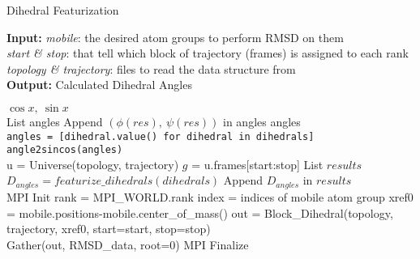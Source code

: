 \begin{algorithm}[ht!]
	\scriptsize
	\caption{Dihedral Featurization}
	\label{alg:Dihedral}
	\hspace*{\algorithmicindent} \textbf{Input:} \emph{mobile}: the desired atom groups to perform RMSD on them \\ 
	\hspace*{\algorithmicindent} \emph{start \& stop}: that tell which block of trajectory (frames) is assigned to each rank \\
	\hspace*{\algorithmicindent} \emph{topology \& trajectory}: files to read the data structure from \\
	\hspace*{\algorithmicindent} \textbf{Output:} Calculated Dihedral Angles
	\begin{algorithmic}[1]
		\State \Return $\cos{x},\: \sin{x}$
		\EndProcedure
		\\
		\State List angles
		\State Append $(\phi (res),\: \psi (res))$ in angles
		\EndFor
		\State \Return angles
		\EndProcedure
		\\
		\State \texttt{angles = [dihedral.value() for dihedral in dihedrals]}
		\State \Return \texttt{angle2sincos(angles)}
		\EndProcedure
		\\
		\State u = Universe(topology, trajectory)
		\State $g$ = u.frames[start:stop] 
		\State List $results$
		\State $D_{angles}=featurize\_dihedrals(dihedrals)$
		\State Append $D_{angles}$ in $results$ 
		\EndFor
		\EndProcedure
		\\      
		\State MPI Init 
		\State rank = MPI\_WORLD.rank
		\State index = indices of mobile atom group
		\State xref0 = mobile.positions-mobile.center\_of\_mass()
		\State out = Block\_Dihedral(topology, trajectory, xref0, start=start, stop=stop)
		\\
		\State Gather(out, RMSD\_data, root=0)
		\State MPI Finalize
	\end{algorithmic}
\end{algorithm}

